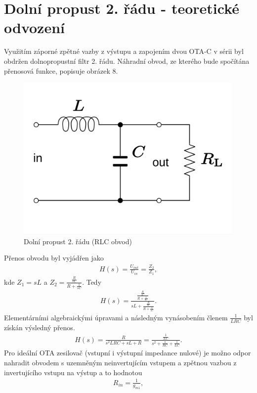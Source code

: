 \documentclass[twoside]{article}
\begin{document}
\section{Dolní propust 2. řádu - teoretické odvození}
Využitím záporné zpětné vazby z výstupu a zapojením dvou OTA-C v sérii byl obdržen dolnopropustní filtr 2. řádu.
\noindent Náhradní obvod, ze kterého bude spočítána přenosová funkce, popisuje obrázek 8.
\begin{figure}[H]
\centering
\includegraphics[scale=0.2]{RLC_low-pass.png}
\caption{Dolní propust 2. řádu (RLC obvod) \cite{7}}
\end{figure}
\noindent Přenos obvodu byl vyjádřen jako
\begin{align}
H(s) = \frac{U_{out}}{U_{in}} = \frac{Z_2}{Z_1},
\end{align}
kde $Z_1 = sL$ a $Z_2 = \frac{\frac{R}{sC}}{R + \frac{1}{sC}}$. Tedy
\begin{align}
H(s) = \frac{\frac{\frac{R}{sC}}{R + \frac{1}{sC}}}{sL + \frac{\frac{R}{sC}}{R + \frac{1}{sC}}}.
\end{align}
Elementárními algebraickými úpravami a následným vynásobením členem $\frac{1}{LRC}$ byl získán výsledný přenos.
\begin{align}
H(s) = \frac{R}{s^2LRC + sL + R} = \frac{\frac{1}{LC}}{s^2 + \frac{s}{RC} + \frac{1}{LC}}.
\end{align}
\noindent Pro ideální OTA zesilovač (vstupní i výstupní impedance nulové) je možno odpor nahradit obvodem s uzemněným neinvertujícím vstupem a zpětnou vazbou z invertujícího vstupu na výstup a to hodnotou
\begin{align}
R_{in} = \frac{1}{g_{m1}},
\end{align}
\end{document}

